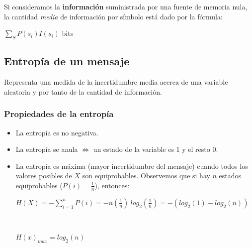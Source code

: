 \documentclass[]{article}
\begin{document}
Si consideramos la \textbf{información} suministrada por una fuente de memoria nula, la cantidad \emph{media} de información por símbolo está dado por la fórmula:
\begin{center}
    $\displaystyle \sum_S P(s_i) I(s_i)$ bits
\end{center}


\subsection{Entropía de un mensaje}

Representa una medida de la incertidumbre media acerca de una variable aleatoria y por tanto de la cantidad de información.

\subsubsection{Propiedades de la entropía}
\begin{itemize}
    \item La entropía es no negativa.
    \item La entropía se anula $\Leftrightarrow$ un estado de la variable es 1 y el resto 0.
    \item La entropía es máxima (mayor incertidumbre del mensaje) cuando todos los  valores posibles de $X$ son equiprobables. Observemos que si hay $n$ estados equiprobables ($P(i) = \frac{1}{n}$), entonces:
    \begin{center}
        $\displaystyle H(X) = -\sum_{i=1}^n P(i) = -n \left(\frac{1}{n}\right)\ log_2\left(\frac{1}{n}\right) = - (log_2(1) - log_2(n))$
    \end{center}
~\newline
    \begin{center}
        $H(x)_{max} = log_2(n)$
    \end{center}
\end{itemize}
\end{document}
